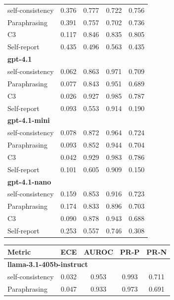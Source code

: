 \documentclass[11pt]{article}
\theoremstyle{plain}
\theoremstyle{definition}
\theoremstyle{remark}
\begin{document}
\begin{table}[p]
\begin{minipage}[t]{0.48\textwidth}
\begin{tabular}{lcccc}
        self-consistency & 0.376 & 0.777 & 0.722 & 0.756 \\
        Paraphrasing     & 0.391 & 0.757 & 0.702 & 0.736 \\
       C3             & 0.117 & 0.846 & 0.835 & 0.805 \\
        Self-report      & 0.435 & 0.496 & 0.563 & 0.435 \\
        \midrule
        \multicolumn{5}{l}{\textbf{gpt-4.1}} \\
        self-consistency & 0.062 & 0.863 & 0.971 & 0.709 \\
        Paraphrasing     & 0.077 & 0.843 & 0.951 & 0.689 \\
       C3             & 0.026 & 0.927 & 0.985 & 0.787 \\
        Self-report      & 0.093 & 0.553 & 0.914 & 0.190 \\
        \midrule
        \multicolumn{5}{l}{\textbf{gpt-4.1-mini}} \\
        self-consistency & 0.078 & 0.872 & 0.964 & 0.724 \\
        Paraphrasing     & 0.093 & 0.852 & 0.944 & 0.704 \\
       C3             & 0.042 & 0.929 & 0.983 & 0.786 \\
        Self-report      & 0.101 & 0.605 & 0.909 & 0.150 \\
        \midrule
        \multicolumn{5}{l}{\textbf{gpt-4.1-nano}} \\
        self-consistency & 0.159 & 0.853 & 0.916 & 0.723 \\
        Paraphrasing     & 0.174 & 0.833 & 0.896 & 0.703 \\
       C3             & 0.090 & 0.878 & 0.943 & 0.688 \\
        Self-report      & 0.253 & 0.557 & 0.746 & 0.308 \\
        \bottomrule
    \end{tabular}
\end{minipage}
\hfill
\begin{minipage}[t]{0.48\textwidth}
    \centering
    \begin{tabular}{lcccc}
        \toprule
        \textbf{Metric} & \textbf{ECE} & \textbf{AUROC} & \textbf{PR-P} & \textbf{PR-N} \\
        \midrule
        \multicolumn{5}{l}{\textbf{llama-3.1-405b-instruct}} \\
        self-consistency & 0.032 & 0.953 & 0.993 & 0.711 \\
        Paraphrasing     & 0.047 & 0.933 & 0.973 & 0.691 \\

\end{tabular}
\end{minipage}
\end{table}
\end{document}
